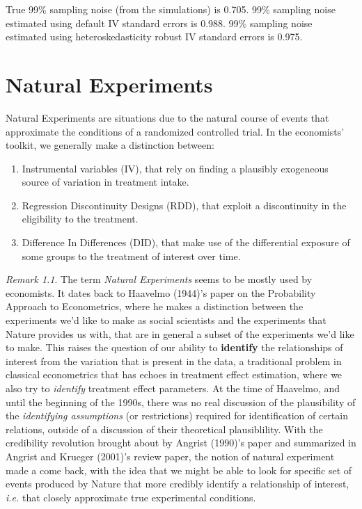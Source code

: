 \documentclass[
]{book}
\providecommand{\tightlist}{%
  \setlength{\itemsep}{0pt}\setlength{\parskip}{0pt}}
\theoremstyle{definition}
\theoremstyle{definition}
\theoremstyle{definition}
\theoremstyle{definition}
\theoremstyle{remark}
\newtheorem*{remark}{Remark}
\begin{document}
True 99\% sampling noise (from the simulations) is 0.705.
99\% sampling noise estimated using default IV standard errors is 0.988.
99\% sampling noise estimated using heteroskedasticity robust IV standard errors is 0.975.

\hypertarget{NE}{%
\chapter{Natural Experiments}\label{NE}}

Natural Experiments are situations due to the natural course of events that approximate the conditions of a randomized controlled trial.
In the economists' toolkit, we generally make a distinction between:

\begin{enumerate}
\def\labelenumi{\arabic{enumi}.}
\tightlist
\item
  Instrumental variables (IV), that rely on finding a plausibly exogeneous source of variation in treatment intake.
\item
  Regression Discontinuity Designs (RDD), that exploit a discontinuity in the eligibility to the treatment.
\item
  Difference In Differences (DID), that make use of the differential exposure of some groups to the treatment of interest over time.
\end{enumerate}

\begin{remark}
\iffalse{} {Remark. } \fi{}The term \emph{Natural Experiments} seems to be mostly used by economists.
It dates back to Haavelmo (1944)'s paper on the Probability Approach to Econometrics, where he makes a distinction between the experiments we'd like to make as social scientists and the experiments that Nature provides us with, that are in general a subset of the experiments we'd like to make.
This raises the question of our ability to \textbf{identify} the relationships of interest from the variation that is present in the data, a traditional problem in classical econometrics that has echoes in treatment effect estimation, where we also try to \emph{identify} treatment effect parameters.
At the time of Haavelmo, and until the beginning of the 1990s, there was no real discussion of the plausibility of the \emph{identifying assumptions} (or restrictions) required for identification of certain relations, outside of a discussion of their theoretical plausiblility.
With the credibility revolution brought about by Angrist (1990)'s paper and summarized in Angrist and Krueger (2001)'s review paper, the notion of natural experiment made a come back, with the idea that we might be able to look for specific set of events produced by Nature that more credibly identify a relationship of interest, \emph{i.e.} that closely approximate true experimental conditions.
\end{remark}
\end{document}
